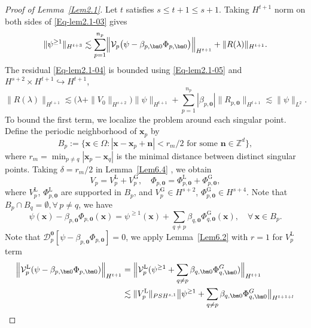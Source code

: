 \documentclass{sn-jnl}%
\newcommand{\bnm}[1]{\bigl\| #1 \bigr\|}
\newcommand{\Bnm}[1]{\Bigl\| #1 \Bigr\|}
\numberwithin{equation}{section}
\theoremstyle{thmstyleone}%
\theoremstyle{thmstyletwo}%
\theoremstyle{thmstylethree}%
\begin{document}
\begin{proof}[Proof of Lemma~\ref{Lem2.1}]
    Let $t$ satisfies $s\leq t+1 \leq s+1$. Taking $H^{t+1}$ norm on both sides of \eqref{Eq-lem2.1-03} gives
    \begin{equation}\label{Eq-lem2.1-07}
        \| \psi^{\geq 1} \|_{H^{t+3}} \lesssim \sum_{p=1}^{n_p}\Bigl\|\mathcal{V}_p\bigl(\psi-\beta_{p,\bm 0}\Phi_{p,\bm 0}\bigr)\Bigr\|_{H^{t+1}}+\|R(\lambda)\|_{H^{t+1}}.
    \end{equation}
    The residual \eqref{Eq-lem2.1-04} is bounded using \eqref{Eq-lem2.1-05} and $H^{s+2}\times H^{t+1}\hookrightarrow H^{t+1}$,
    \begin{equation}\label{Eq-lem2.1-08}
        \|R(\lambda)\|_{H^{t+1}} \lesssim \bigl(\lambda+\|V_0\|_{H^{s+2}}\bigr)\|\psi\|_{H^{t+1}} +\sum_{p=1}^{n_p}|\beta_{p,\bm 0}|\|R_{p,\bm 0}\|_{H^{t+1}}\lesssim \|\psi\|_{L^2}.
    \end{equation}
    To bound the first term, we localize the problem around each singular point. Define the periodic neighborhood of $\bm x_p$ by
    \begin{equation}\label{Eq-lem2.1-09}
    B_{p}:=\bigl\{\bm x \in \Omega :|\bm x-\bm x_p+\bm n|<r_m/2 \text{ for some } \bm n\in \mathbb{Z}^d\bigr\},
    \end{equation}
    where $r_m = \min_{p\neq q}|\bm x_p - \bm x_q|$ is the minimal distance between distinct singular points. Taking $\delta = r_m/2$ in Lemma~\ref{Lem6.4} , we obtain
    \[
        V_p = V_p^{\mathrm{L}}+V^{\mathrm{G}}_p,\quad 
        \Phi_{p,\bm 0} = \Phi_{p,\bm 0}^{\mathrm{L}}+\Phi^{\mathrm{G}}_{p,\bm 0},
    \]
    where $V^{\mathrm{L}}_p$, $\Phi^{\mathrm{L}}_{p,\bm 0}$ are supported in $B_p$, and $V_p^{\mathrm{G}}\in H^{s+2}$, $\Phi_{p,\bm 0}^{\mathrm{G}}\in H^{s+4}$. Note that $B_p\cap B_q = \emptyset, \forall\, p\neq q$, we have  
    \[
        \psi(\bm x)-\beta_{p,\bm 0}\Phi_{p,\bm 0}(\bm x) = \psi^{\geq 1}(\bm x) +\sum_{q\neq p} \beta_{q,\bm 0}\Phi_{q,\bm 0}^{\mathrm{G}}(\bm x), \quad \forall\, \bm x\in B_p.
    \]
    Note that $\mathcal{D}_{p}^{\bm 0}[\psi - \beta_{p,\bm 0}\Phi_{p,\bm 0}]=0$, we apply Lemma~\ref{Lem6.2} with $r=1$ for $V^{\mathrm{L}}_p$ term 
    \begin{equation}\label{Eq-lem2.1-10}
    \begin{aligned}
        \Bnm{\mathcal{V}_p^{\mathrm{L}}(\psi - \beta_{p,\bm 0}\Phi_{p,\bm 0})}_{H^{t+1}} 
        &=\Bnm{\mathcal{V}_p^{\mathrm{L}}(\psi^{\ge 1} +\sum_{q\neq p} \beta_{q,\bm 0}\Phi^{G}_{q,\bm 0})}_{H^{t+1}}\\
        &\lesssim \|V^{\mathrm{L}}_p\|_{PSH^{s,1}}\bnm{\psi^{\ge 1} +\sum_{q\neq p} \beta_{q,\bm 0}\Phi^{G}_{q,\bm 0}}_{H^{t+1+l}}\\

\end{aligned}
\end{equation}
\end{proof}
\end{document}
